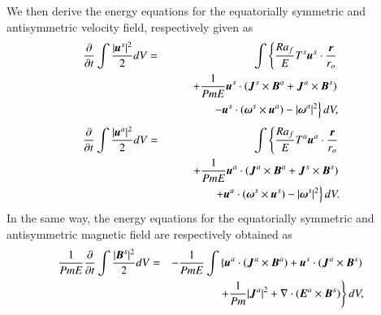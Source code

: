 We then derive the energy equations for the equatorially symmetric and antisymmetric velocity field, {\color{red} respectively given as}
%
\begin{eqnarray}
\displaystyle
\frac{\partial}{\partial t}
 \int \frac{|\mbox{\boldmath$u$}^s|^2}{2} d V 
 &=& \int \left\{
      \frac{Ra_f}{E}T^s \mbox{\boldmath$u$}^s\cdot \frac{\mbox{\boldmath$r$}}{r_{o}}
     \right.
\nonumber \\
& & \displaystyle
\hspace*{2em}
     \left.
    + \frac{1}{Pm E} \mbox{\boldmath$u$}^s \cdot
                (\mbox{\boldmath$J$}^s \times \mbox{\boldmath$B$}^a
                +\mbox{\boldmath$J$}^a \times \mbox{\boldmath$B$}^s)
      \right.
\nonumber \\
& &\displaystyle
\hspace*{3em}
      \left.
    - \mbox{\boldmath$u$}^s \cdot 
       (\mbox{\boldmath$\omega$}^s \times \mbox{\boldmath$u$}^a)
    - |\mbox{\boldmath$\omega$}^a|^2 
      \right\} d V,
\label{eq:energy_us}
\end{eqnarray}
%
\begin{eqnarray}
\displaystyle
\frac{\partial}{\partial t}
 \int \frac{|\mbox{\boldmath$u$}^a|^2}{2} d V 
 & = & \displaystyle
\hspace*{1em}
\int \left\{
      \frac{Ra_f}{E}T^a \mbox{\boldmath$u$}^a\cdot \frac{\mbox{\boldmath$r$}}{r_{o}}
     \right.
\nonumber \\
& & \displaystyle
\hspace*{2em}
     \left.
    + \frac{1}{Pm E} \mbox{\boldmath$u$}^a \cdot
                (\mbox{\boldmath$J$}^a \times \mbox{\boldmath$B$}^a
                +\mbox{\boldmath$J$}^s \times \mbox{\boldmath$B$}^s)
      \right.
\nonumber \\
& & \displaystyle
\hspace*{3em}
      \left.
    + \mbox{\boldmath$u$}^a \cdot 
       (\mbox{\boldmath$\omega$}^s \times \mbox{\boldmath$u$}^s)
    - |\mbox{\boldmath$\omega$}^s|^2 
      \right\} d V.
\label{eq:energy_ua}
\end{eqnarray}
%
In the same way, the energy equations for the equatorially symmetric and antisymmetric magnetic field are respectively obtained as
%
\begin{eqnarray}
\displaystyle
\frac{1}{Pm E}\frac{\partial}{\partial t}
 \int \frac{|\mbox{\boldmath$B$}^s|^2}{2} d V
 & = & - \frac{1}{Pm E}\int \left\{
      \mbox{\boldmath$u$}^a \cdot 
          ( \mbox{\boldmath$J$}^a \times \mbox{\boldmath$B$}^a )
    + \mbox{\boldmath$u$}^s \cdot 
          ( \mbox{\boldmath$J$}^a \times \mbox{\boldmath$B$}^s )
    \right.
\nonumber \\
\hspace{3em}
&& \displaystyle
    \left.
    + \frac{1}{Pm} |\mbox{\boldmath$J$}^a|^2
    + \nabla \cdot ( \mbox{\boldmath$E$}^a \times \mbox{\boldmath$B$}^s ) 
      \right\} d V,
\label{eq:energy_Bs}
\end{eqnarray}
